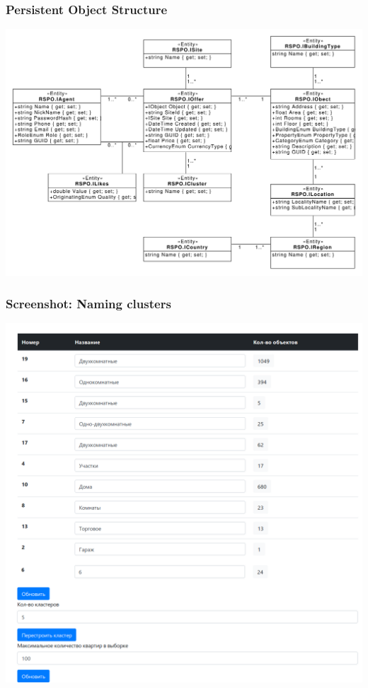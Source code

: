 \documentclass[10pt,dvipsnames]{beamer}
\begin{document}
\begin{frame}
  \frametitle{Persistent Object Structure}
   \centering
   \includegraphics[width=1\linewidth]{class_diagram.pdf}
\end{frame}

\begin{frame}
  \frametitle{Screenshot: Naming clusters}
   \includegraphics[width=1\linewidth]{screen-cluster.png}
\end{frame}
\end{document}
